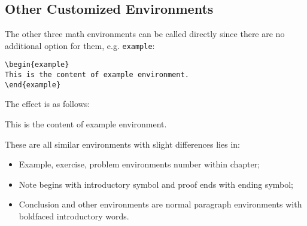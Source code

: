 \subsection{Other Customized Environments}
The other three math environments can be called directly since there are no additional option for them, e.g. \lstinline{example}:
\begin{lstlisting}
\begin{example}
This is the content of example environment.
\end{example}
\end{lstlisting}

The effect is as follows:

\begin{example}
    This is the content of example environment.
\end{example}

These are all similar environments with slight differences lies in:

\begin{itemize}
    \item Example, exercise, problem environments number within chapter;
    \item Note begins with introductory symbol and proof ends with ending symbol;
    \item Conclusion and other environments are normal paragraph environments with boldfaced introductory words.
\end{itemize}


